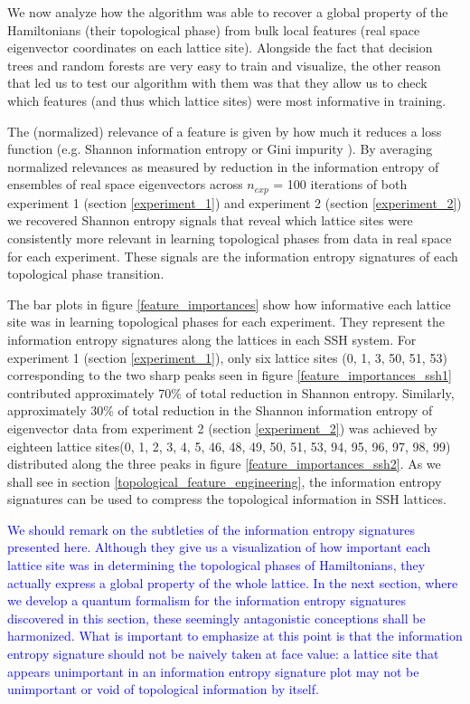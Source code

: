 \documentclass[10pt]{revtex4-1}
\begin{document}
We now analyze how the algorithm was able to recover a global property of the Hamiltonians (their topological phase) from bulk local features (real space eigenvector coordinates on each lattice site). Alongside the fact that decision trees and random forests are very easy to train and visualize, the other reason that led us to test our algorithm with them was that they allow us to check which features (and thus which lattice sites) were most informative in training.

The (normalized) relevance of a feature is given by how much it reduces a loss function (e.g. Shannon information entropy or Gini impurity \cite{friedman2001elements}). By averaging normalized relevances as measured by reduction in the information entropy of ensembles of real space eigenvectors across $n_{exp}$ = 100 iterations of both experiment 1 (section \ref{experiment_1}) and experiment 2 (section \ref{experiment_2}) we recovered Shannon entropy signals that reveal which lattice sites were consistently more relevant in learning topological phases from data in real space for each experiment. These signals are the information entropy signatures of each topological phase transition. 

The bar plots in figure \ref{feature_importances} show how informative each lattice site was in learning topological phases for each experiment. They represent the information entropy signatures along the lattices in each SSH system. For experiment 1 (section \ref{experiment_1}), only six lattice sites (0, 1, 3, 50, 51, 53) corresponding to the two sharp peaks seen in figure \ref{feature_importances_ssh1} contributed approximately 70\% of total reduction in Shannon entropy. Similarly, approximately 30\% of total reduction in the Shannon information entropy of eigenvector data from experiment 2 (section \ref{experiment_2}) was achieved by eighteen lattice sites(0, 1, 2, 3, 4, 5, 46, 48, 49, 50, 51, 53, 94, 95, 96, 97, 98, 99) distributed along the three peaks in figure \ref{feature_importances_ssh2}. As we shall see in section \ref{topological_feature_engineering}, the information entropy signatures can be used to compress the topological information in SSH lattices.

\textcolor{blue}{We should remark on the subtleties of the information entropy signatures presented here. Although they give us a visualization of how important each lattice site was in determining the topological phases of Hamiltonians, they actually express a global property of the whole lattice. In the next section, where we develop a quantum formalism for the information entropy signatures discovered in this section, these seemingly antagonistic conceptions shall be harmonized. What is important to emphasize at this point is that the information entropy signature should not be naively taken at face value: a lattice site that appears unimportant in an information entropy signature plot may not be unimportant or void of topological information by itself.}
\end{document}

